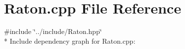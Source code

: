 \section{Raton.\+cpp File Reference}
\label{_raton_8cpp}
{\ttfamily \#include \char`\"{}../include/\+Raton.\+hpp\char`\"{}}\\*
Include dependency graph for Raton.\+cpp\+:
